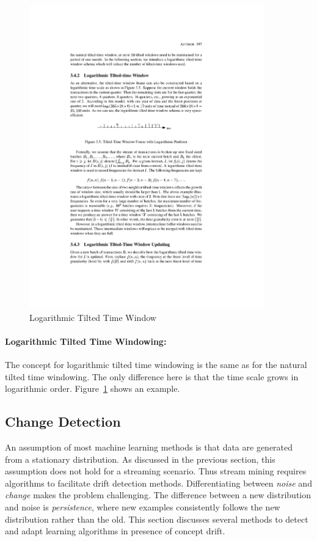 \begin{figure}[htbp]
    \begin{center}
        \includegraphics[width=4.0in]{figs/logtime.pdf}
        \caption{Logarithmic Tilted Time Window}
        \label{fig:bg:ltime}
    \end{center}
\end{figure}
\paragraph{Logarithmic Tilted Time Windowing:} The concept for logarithmic tilted time windowing is the same as for the natural tilted time windowing. The only difference here is that the time scale grows in logarithmic order. Figure~\ref{fig:bg:ltime} shows an example. 


\subsection{Change Detection}
\label{sec:bg:changedetection}
An assumption of most machine learning methods is that data are generated from a stationary distribution. As discussed in the previous section, this assumption does not hold for a streaming scenario. Thus stream mining requires algorithms to facilitate drift detection methods. Differentiating between {\it noise} and {\it change} makes the problem challenging. The difference between a new distribution and noise is {\it persistence}, where new examples consistently follows the new distribution rather than the old. This section discusses several methods to detect and adapt learning algorithms in presence of concept drift.

